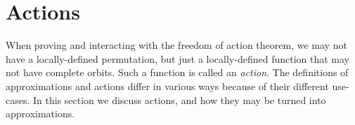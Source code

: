 \section{Actions}

When proving and interacting with the freedom of action theorem, we may not have a locally-defined permutation, but just a locally-defined function that may not have complete orbits.
Such a function is called an \emph{action}.
The definitions of approximations and actions differ in various ways because of their different use-cases.
In this section we discuss actions, and how they may be turned into approximations.








